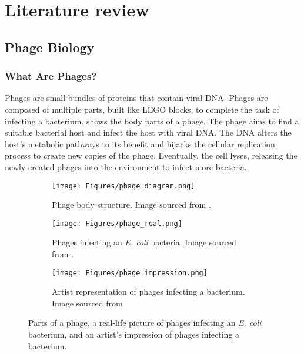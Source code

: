 \chapter{Literature review}
\label{LR}

\section{Phage Biology}
\subsection{What Are Phages?}
Phages are small bundles of proteins that contain viral DNA. 
Phages are composed of multiple parts, built like LEGO blocks, to complete the task of infecting a bacterium. 
 shows the body parts of a phage. 
The phage aims to find a suitable bacterial host and infect the host with viral DNA. 
The DNA alters the host’s metabolic pathways to its benefit and hijacks the cellular replication process to create new copies of the phage. 
Eventually, the cell lyses, releasing the newly created phages into the environment to infect more bacteria. 
\begin{figure}[h!]
    \centering
    \begin{subfigure}{0.25\linewidth}
        \centering
        \captionsetup{width=1\linewidth}
        \texttt{[image: Figures/phage\_diagram.png]}
        \caption{
            Phage body structure. 
            Image sourced from \citet{FlatIllustrationBacteriophage}. 
        }
        \label{fig:figures:phage_diagram}
    \end{subfigure}
    \hfill
    \begin{subfigure}{0.3\linewidth}
        \centering
        \captionsetup{width=1\linewidth}
        \texttt{[image: Figures/phage\_real.png]}
        \caption{
            Phages infecting an \textit{E. coli} bacteria. 
            Image sourced from \citet{twilleyWorldViralDark2015}. 
        }
        \label{fig:figures:phage_real}
    \end{subfigure}
    \hfill
    \begin{subfigure}{0.35\linewidth}
        \centering
        \captionsetup{width=1\linewidth}
        \texttt{[image: Figures/phage\_impression.png]}
        \caption{
            Artist representation of phages infecting a bacterium. 
            Image sourced from \citet{VirusesMayPlay} 
        }
        \label{fig:figures:phage_impression}
    \end{subfigure}
    \caption{Parts of a phage, a real-life picture of phages infecting an \textit{E. coli} bacterium, and an artist’s impression of phages infecting a bacterium. }
\end{figure}

